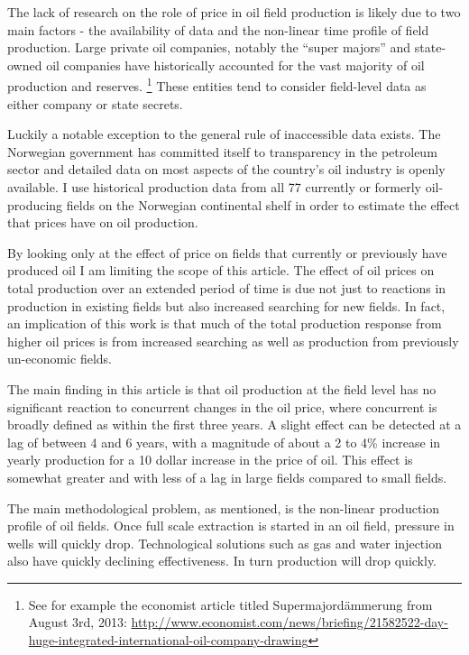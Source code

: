 \documentclass[12pt]{scrartcl} %
\begin{document}

The lack of research on the role of price in oil field production is likely due to two main factors - the availability of data and the non-linear time profile of field production.  Large private oil companies, notably the “super majors” and state-owned oil companies have historically accounted for the vast majority of oil production and reserves. \footnote{See for example the economist article titled Supermajordämmerung from August 3rd, 2013: \url{http://www.economist.com/news/briefing/21582522-day-huge-integrated-international-oil-company-drawing}} These entities tend to consider field-level data as either company or state secrets.   

Luckily a notable exception to the general rule of inaccessible data exists.  The Norwegian government has committed itself to transparency in the petroleum sector and detailed data on most aspects of the country’s oil industry is openly available.  I use historical production data from all 77 currently or formerly oil-producing fields on the Norwegian continental shelf in order to estimate the effect that prices have on oil production.  

By looking only at the effect of price on fields that currently or previously have produced oil I am limiting the scope of this article.  The effect of oil prices on total production over an extended period of time is due not just to reactions in production in existing fields but also increased searching for new fields.  In fact, an implication of this work is that much of the total production response from higher oil prices is from increased searching as well as production from previously un-economic fields.

The main finding in this article is that oil production at the field level has no significant reaction to concurrent changes in the oil price, where concurrent is broadly defined as within the first three years.  A slight effect can be detected at a lag of between 4 and 6 years, with a magnitude of about a 2 to 4\% increase in yearly production for a 10 dollar increase in the price of oil.  This effect is somewhat greater and with less of a lag in large fields compared to small fields.

The main methodological problem, as mentioned, is the non-linear production profile of oil fields.  Once full scale extraction is started in an oil field, pressure in wells will quickly drop.  Technological solutions such as gas and water injection also have quickly declining effectiveness.  In turn production will drop quickly. 
\end{document}
